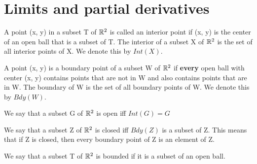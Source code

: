 \section{Limits and partial derivatives}


A point (x, y) in a subset T of $\mathbb{R}^2$ is called an interior point if (x, y) is the center of 
an open ball that is a subset of T. The interior of a subset X of $\mathbb{R}^2$ is the set of all interior 
points of X. We denote this by $Int(X)$.

A point (x, y) is a boundary point of a subset W of $\mathbb{R}^2$ if \textbf{every} open ball with center 
(x, y) contains points that are not in W and also contains points that are in W. The boundary of W is 
the set of all boundary points of W. We denote this by $Bdy(W)$. 

We say that a subset G of $\mathbb{R}^2$ is open iff $Int(G) = G$

We say that a subset Z of $\mathbb{R}^2$ is closed iff $Bdy(Z)$ is a subset of Z. This means that if Z is closed, 
then every boundary point of Z is an element of Z. 

We say that a subset T of $\mathbb{R}^2$ is bounded if it is a subset of an open ball. 

